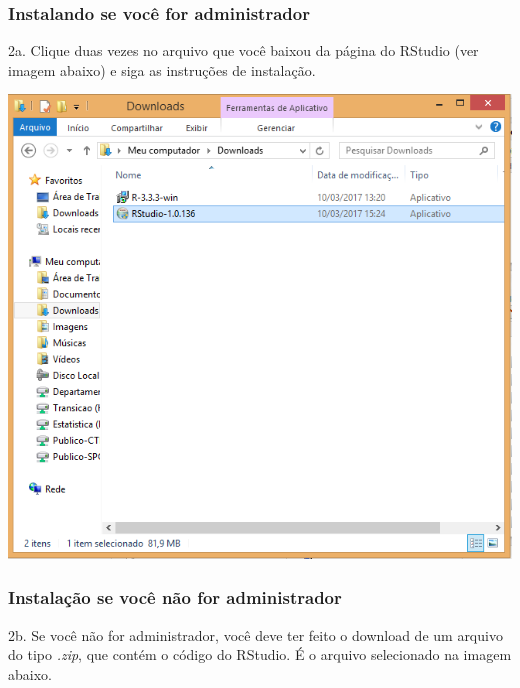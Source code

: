 \documentclass[
]{book}
\begin{document}
\hypertarget{instalando-se-vocuxea-for-administrador}{%
\subsubsection{Instalando se você for administrador}\label{instalando-se-vocuxea-for-administrador}}

2a. Clique duas vezes no arquivo que você baixou da página do RStudio (ver imagem abaixo) e siga as instruções de instalação.

\begin{center}\includegraphics[width=9.06in]{img/instalacao/rstudio-instalador} \end{center}

\hypertarget{instalauxe7uxe3o-se-vocuxea-nuxe3o-for-administrador}{%
\subsubsection{Instalação se você não for administrador}\label{instalauxe7uxe3o-se-vocuxea-nuxe3o-for-administrador}}

2b. Se você não for administrador, você deve ter feito o download de um arquivo do tipo \emph{.zip}, que contém o código do RStudio. É o arquivo selecionado na imagem abaixo.
\end{document}
